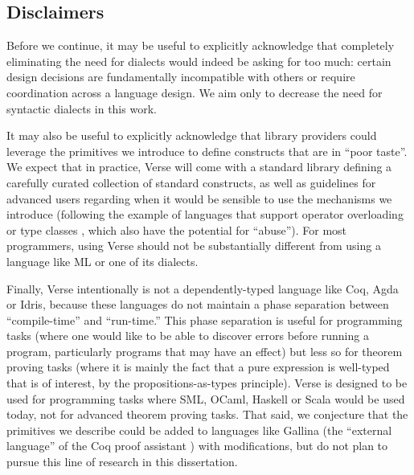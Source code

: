 \subsection{Disclaimers}
Before we continue, it may be useful to explicitly acknowledge that completely eliminating the need for dialects would indeed be asking for too much: certain design decisions are fundamentally incompatible with others or require coordination across a language design. We aim only to decrease the need for syntactic dialects in this work. %

It may also be useful to explicitly acknowledge that library providers could leverage the primitives we introduce   to define constructs that are in ``poor taste''. We  expect that in practice, Verse will come with a standard library defining a carefully curated collection of standard constructs, as well as guidelines for advanced users regarding when it would be sensible to use the mechanisms we introduce (following the example of languages that support operator overloading or type classes \cite{Hall:1996:TCH:227699.227700}, which also have the potential for ``abuse''). For most programmers, using Verse should not be substantially different from using a language like ML or one of its dialects.%

Finally, Verse intentionally is not a dependently-typed language like Coq, Agda or Idris, because these languages do not maintain a phase separation between ``compile-time'' and ``run-time.'' This phase separation is useful for programming tasks (where one would like to be able to discover errors before running a program, particularly programs that may have an effect) but less so for theorem proving tasks (where it is mainly the fact that a pure expression is well-typed that is of interest, by the propositions-as-types principle). Verse is designed to be used for programming tasks where SML, OCaml, Haskell or Scala would be used today, not for advanced theorem proving tasks. That said, we conjecture that the primitives we describe could be added to languages like Gallina (the ``external language'' of the Coq proof assistant  \cite{Coq:manual}) with  modifications, but do not plan to pursue this line of research in this dissertation. %

